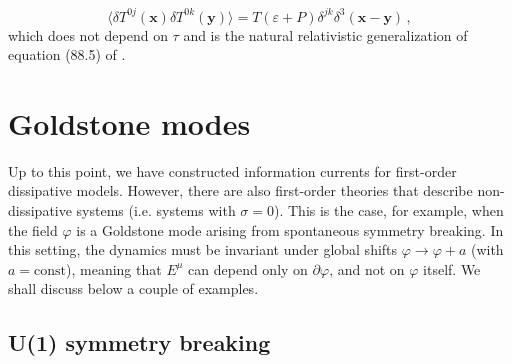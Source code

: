 \documentclass[a4paper, amsfonts, amssymb, amsmath, reprint, showkeys, nofootinbib, twoside,notitlepage,onecolumn,preprintnumbers]{revtex4-2}
\theoremstyle{definition}
\theoremstyle{theorem}
\theoremstyle{corollary}
\begin{document}
\begin{equation}
    \langle \delta T^{0j}(\textbf{x})\delta T^{0k}(\textbf{y})\rangle = T(\varepsilon{+}P)\delta^{jk}\delta^3(\textbf{x}-\textbf{y}) \, ,
\end{equation}
which does not depend on $\tau$ and is the natural relativistic generalization of equation (88.5) of \cite{landau9}.


\section{Goldstone modes} \label{tinytim}

Up to this point, we have constructed information currents for first-order dissipative models. However, there are also first-order theories that describe non-dissipative systems (i.e. systems with $\sigma=0$).  This is the case, for example, when the field $\varphi$ is a Goldstone mode arising from spontaneous symmetry breaking. In this setting, the dynamics must be invariant under global shifts $\varphi \rightarrow \varphi+a$ (with $a=\text{const}$), meaning that $E^\mu$ can depend only on $\partial \varphi$, and not on $\varphi$ itself. We shall discuss below a couple of examples.

\subsection{U(1) symmetry breaking}\label{SySy}
\end{document}
